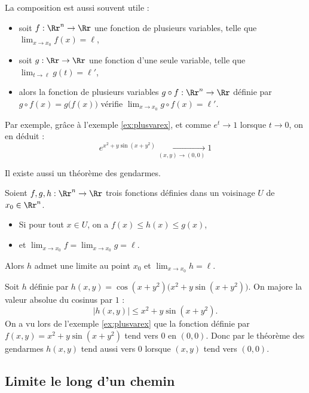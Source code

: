 \documentclass[12pt, class=report,crop=false]{standalone}
\begin{document}
La composition est aussi souvent utile : 
\begin{itemize}
  \item soit $f : \Rr^n \to \Rr$ une fonction de plusieurs variables, telle que $\lim_{x \to x_0} f(x) = \ell$,
  \item soit $g : \Rr \to \Rr$ une fonction d'une seule variable, telle que 
$\lim_{t \to \ell} g(t) = \ell'$,
  \item alors la fonction de plusieurs variables $g \circ f : \Rr^n \to \Rr$ définie par $g \circ f (x) = g \big( f(x) \big)$ vérifie
  $\lim_{x \to x_0} g \circ f(x) = \ell'$.
\end{itemize}

Par exemple, grâce à l'exemple \ref{ex:plusvarex}, et comme $e^t \to 1$ lorsque $t\to 0$, on en déduit :
$$e^{x^2+y\sin(x+y^2)} \underset{(x,y) \to (0,0)}{\longrightarrow} 1$$


\bigskip

Il existe aussi un théorème \og{}des gendarmes\fg{}.
\begin{theoreme} 
Soient $f,g,h:\Rr^n\to \Rr$ trois fonctions définies dans un voisinage $U$ de $x_0 \in \Rr^n$.
\begin{itemize}
  \item Si pour tout $x \in U$, on a $f(x) \le  h(x) \le g(x)$,
  \item et $\lim _{x \to x_0}f = \lim_{x \to x_0}g = \ell$.
\end{itemize}
Alors $h$ admet une limite au point $x_0$ et $\displaystyle \lim _{x \to x_0} h=\ell$.
\end{theoreme}



\begin{exemple}
Soit $h$ définie par $h(x,y) = \cos(x+y^2)\big( x^2+y\sin(x+y^2) \big)$.
On majore la valeur absolue du cosinus par $1$ :
$$\big| h(x,y) \big| \le x^2+y\sin(x+y^2) .$$
On a vu lors de l'exemple \ref{ex:plusvarex} que la fonction définie par
$f(x,y) = x^2+y\sin(x+y^2)$ tend vers $0$ en $(0,0)$. 
Donc par le théorème des gendarmes $h(x,y)$ tend aussi vers $0$ lorsque $(x,y)$ tend vers $(0,0)$.
\end{exemple}



\subsection{Limite le long d'un chemin}
\end{document}

